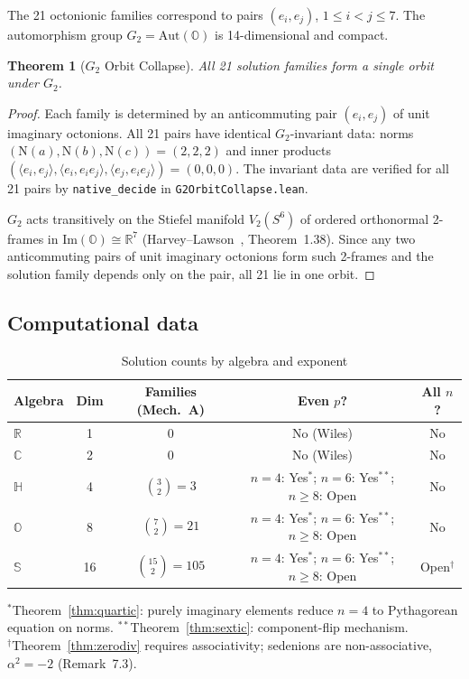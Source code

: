 \documentclass[11pt]{amsart}
\theoremstyle{plain}
\newtheorem{theorem}{Theorem}[section]
\theoremstyle{definition}
\theoremstyle{remark}
\newcommand{\R}{\mathbb{R}}
\newcommand{\C}{\mathbb{C}}
\newcommand{\HH}{\mathbb{H}}
\newcommand{\OO}{\mathbb{O}}
\newcommand{\Se}{\mathbb{S}}
\newcommand{\Norm}[1]{\mathrm{N}(#1)}
\newcommand{\Aut}{\mathrm{Aut}}
\begin{document}
The 21 octonionic families correspond to pairs $(e_i, e_j)$, $1 \leq i < j \leq 7$.
The automorphism group $G_2 = \Aut(\OO)$ is 14-dimensional and compact.

\begin{theorem}[$G_2$ Orbit Collapse]\label{thm:g2orbit}
All 21 solution families form a single orbit under $G_2$.
\end{theorem}

\begin{proof}
Each family is determined by an anticommuting pair $(e_i, e_j)$ of unit imaginary octonions.
All 21 pairs have identical $G_2$-invariant data:
norms $(\Norm{a}, \Norm{b}, \Norm{c}) = (2, 2, 2)$ and inner products
$(\langle e_i, e_j \rangle, \langle e_i, e_i e_j \rangle, \langle e_j, e_i e_j \rangle) = (0, 0, 0)$.
The invariant data are verified for all 21 pairs by \texttt{native\_decide}
in \texttt{G2OrbitCollapse.lean}.

$G_2$ acts transitively on the Stiefel manifold $V_2(S^6)$ of ordered orthonormal
2-frames in $\mathrm{Im}(\OO) \cong \R^7$
(Harvey--Lawson~\cite{HarveyLawson1982}, Theorem~1.38).
Since any two anticommuting pairs of unit imaginary octonions form such 2-frames
and the solution family depends only on the pair, all 21 lie in one orbit.
\end{proof}

\subsection{Computational data}

\begin{table}[h]
\centering
\caption{Solution counts by algebra and exponent}\label{tab:solutions}
\begin{tabular}{@{}lcccc@{}}
  \toprule
  Algebra & Dim & Families (Mech.~A) & Even $p$? & All $n$? \\
  \midrule
  $\R$ & 1 & 0 & No (Wiles) & No \\
  $\C$ & 2 & 0 & No (Wiles) & No \\
  $\HH$ & 4 & $\binom{3}{2} = 3$ & $n{=}4$: Yes$^*$; $n{=}6$: Yes$^{**}$; $n{\geq}8$: Open & No \\
  $\OO$ & 8 & $\binom{7}{2} = 21$ & $n{=}4$: Yes$^*$; $n{=}6$: Yes$^{**}$; $n{\geq}8$: Open & No \\
  $\Se$ & 16 & $\binom{15}{2} = 105$ & $n{=}4$: Yes$^*$; $n{=}6$: Yes$^{**}$; $n{\geq}8$: Open & Open$^\dagger$ \\
  \bottomrule
\end{tabular}

\smallskip\noindent
{\footnotesize ${}^*$Theorem~\ref{thm:quartic}: purely imaginary elements
reduce $n{=}4$ to Pythagorean equation on norms.
${}^{**}$Theorem~\ref{thm:sextic}: component-flip mechanism.\\
${}^\dagger$Theorem~\ref{thm:zerodiv} requires associativity;
sedenions are non-associative, $\alpha^2 = -2$ (Remark~7.3).}
\end{table}
\end{document}
